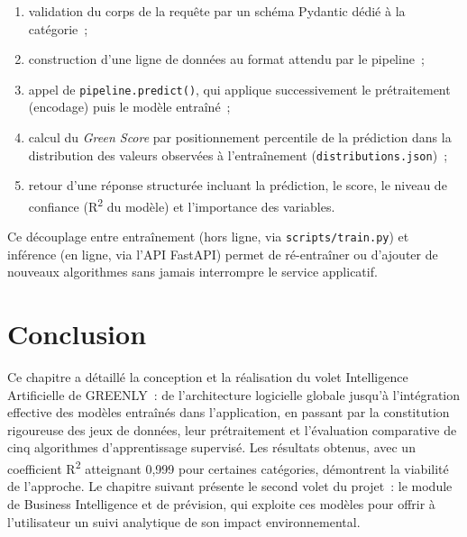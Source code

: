 \begin{enumerate}
    \item validation du corps de la requête par un schéma Pydantic dédié à la catégorie~;
    \item construction d'une ligne de données au format attendu par le pipeline~;
    \item appel de \texttt{pipeline.predict()}, qui applique successivement le prétraitement (encodage) puis le modèle entraîné~;
    \item calcul du \textit{Green Score} par positionnement percentile de la prédiction dans la distribution des valeurs observées à l'entraînement (\texttt{distributions.json})~;
    \item retour d'une réponse structurée incluant la prédiction, le score, le niveau de confiance (R\textsuperscript{2} du modèle) et l'importance des variables.
\end{enumerate}

Ce découplage entre entraînement (hors ligne, via \texttt{scripts/train.py}) et inférence (en ligne, via l'API FastAPI) permet de ré-entraîner ou d'ajouter de nouveaux algorithmes sans jamais interrompre le service applicatif.

\section*{Conclusion}
Ce chapitre a détaillé la conception et la réalisation du volet Intelligence Artificielle de GREENLY~: de l'architecture logicielle globale jusqu'à l'intégration effective des modèles entraînés dans l'application, en passant par la constitution rigoureuse des jeux de données, leur prétraitement et l'évaluation comparative de cinq algorithmes d'apprentissage supervisé. Les résultats obtenus, avec un coefficient R\textsuperscript{2} atteignant 0,999 pour certaines catégories, démontrent la viabilité de l'approche. Le chapitre suivant présente le second volet du projet~: le module de Business Intelligence et de prévision, qui exploite ces modèles pour offrir à l'utilisateur un suivi analytique de son impact environnemental.
